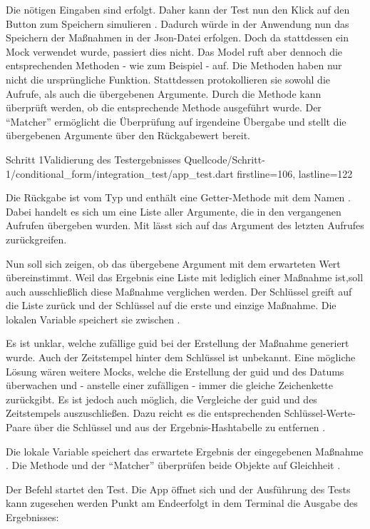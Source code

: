 Die nötigen Eingaben sind erfolgt. Daher kann der Test nun den Klick auf den Button zum Speichern simulieren . Dadurch würde in der Anwendung nun das Speichern der Maßnahmen in der Json-Datei erfolgen. Doch da stattdessen ein Mock verwendet wurde, passiert dies nicht. Das Model ruft aber dennoch die entsprechenden Methoden - wie zum Beispiel  - auf. Die Methoden haben nur nicht die ursprüngliche Funktion. Stattdessen protokollieren sie sowohl die Aufrufe, als auch die übergebenen Argumente. Durch die Methode   kann überprüft werden, ob die entsprechende Methode  ausgeführt wurde. Der \enquote{Matcher}  ermöglicht die Überprüfung auf irgendeine Übergabe und stellt die übergebenen Argumente über den Rückgabewert bereit.

\begin{alexlisting}{Schritt 1}{Validierung des Testergebnisses}
  {Quellcode/Schritt-1/conditional_form/integration_test/app_test.dart}
  {firstline=106, lastline=122}
\end{alexlisting}

Die Rückgabe ist vom Typ  und enthält eine Getter-Methode mit dem Namen . Dabei handelt es sich um eine Liste aller Argumente, die in den vergangenen Aufrufen übergeben wurden. Mit  lässt sich auf das Argument des letzten Aufrufes zurückgreifen.

Nun soll sich zeigen, ob das übergebene Argument mit dem erwarteten Wert übereinstimmt. Weil das Ergebnis eine Liste mit lediglich einer Maßnahme ist,soll auch ausschließlich diese Maßnahme verglichen werden. Der Schlüssel  greift auf die Liste zurück und der Schlüssel  auf die erste und einzige Maßnahme. Die lokalen Variable  speichert sie zwischen .

Es ist unklar, welche zufällige guid bei der Erstellung der Maßnahme generiert wurde. Auch der Zeitstempel hinter dem Schlüssel  ist unbekannt. Eine mögliche Lösung wären weitere Mocks, welche die Erstellung der guid und des Datums überwachen und - anstelle einer zufälligen - immer die gleiche Zeichenkette zurückgibt. Es ist jedoch auch möglich, die Vergleiche der guid und des Zeitstempels auszuschließen. Dazu reicht es die entsprechenden Schlüssel-Werte-Paare über die Schlüssel  und  aus der Ergebnis-Hashtabelle zu entfernen .

Die lokale Variable  speichert das erwartete Ergebnis der eingegebenen Maßnahme . Die Methode  und der \enquote{Matcher}  überprüfen beide Objekte auf Gleichheit .

Der Befehl  startet den Test. Die App öffnet sich und der Ausführung des Tests kann zugesehen werden Punkt am Endeerfolgt in dem Terminal die Ausgabe des Ergebnisses: 


\clearpage
